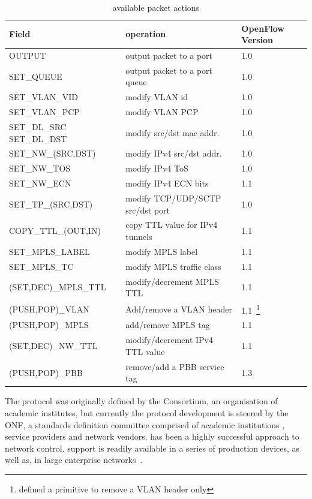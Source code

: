   \begin{table}
  \begin{minipage} [b]{0.49\textwidth} 
    \begin{tabular}{| p{4cm} | p{6cm}  | p{1.5cm} |} 
      \hline
      Field & operation & OpenFlow Version \\ \hline
      OUTPUT & output packet to a port & 1.0 \\ \hline
      SET\_QUEUE & output packet to a port queue & 1.0 \\ \hline
      SET\_VLAN\_VID & modify VLAN id & 1.0 \\ \hline 
      SET\_VLAN\_PCP & modify VLAN PCP & 1.0 \\ \hline
      SET\_DL\_SRC SET\_DL\_DST & modify src/dst mac addr. & 1.0 \\ \hline
      SET\_NW\_(SRC,DST) & modify IPv4 src/dst addr. & 1.0 \\ \hline
      SET\_NW\_TOS & modify IPv4 ToS & 1.0 \\ \hline
      SET\_NW\_ECN & modify IPv4 ECN bits & 1.1 \\ \hline
      SET\_TP\_(SRC,DST) & modify TCP/UDP/SCTP src/dst port & 1.0 \\ \hline
      COPY\_TTL\_(OUT,IN) & copy TTL value for IPv4 tunnels & 1.1  \\ \hline
      SET\_MPLS\_LABEL & modify MPLS label & 1.1 \\ \hline
      SET\_MPLS\_TC & modify MPLS traffic class & 1.1 \\ \hline
      (SET,DEC)\_MPLS\_TTL & modify/decrement MPLS TTL & 1.1 \\ \hline
      (PUSH,POP)\_VLAN & Add/remove a VLAN header & 1.1~\footnote{\of 1.0 defined
        a primitive to remove a VLAN header only} \\ \hline
      (PUSH,POP)\_MPLS & add/remove MPLS tag & 1.1 \\ \hline
      (SET,DEC)\_NW\_TTL & modify/decrement IPv4 TTL value & 1.1 \\ \hline
      (PUSH,POP)\_PBB & remove/add a PBB service tag & 1.3 \\ \hline

    \end{tabular}
  \end{minipage}
  \caption{\of available packet actions} \label{tbl:background:openflow_actions}
\end{table}

The \of protocol was originally defined by the \of Consortium, an organisation
of academic institutes, but currently the protocol development is steered by the
ONF, a standards definition committee comprised of academic institutions ,
service providers and network vendors. \of has been a highly successful approach
to network control. \of support is readily available in a series of production
devices, as well as, in large enterprise
networks~.

